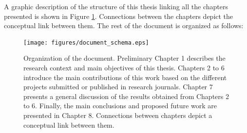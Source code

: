 A graphic description of the structure of this thesis linking all the chapters presented is shown in Figure \ref{document_structure}. Connections between the chapters depict the conceptual link between them. The rest of the document is organized as follows:

\begin{figure}[top]
  \begin{center}
    \texttt{[image: figures/document\_schema.eps]}
  \end{center}
    \caption[Organization of the document]{Organization of the document. Preliminary Chapter 1 describes the research context and main objectives of this thesis. Chapters 2 to 6 introduce the main contributions of this work based on the different projects submitted or published in research journals. Chapter 7 presents a general discussion of the results obtained from Chapters 2 to 6. Finally, the main conclusions and proposed future work are presented in Chapter 8. Connections between chapters depict a conceptual link between them.}
    \label{document_structure}
\end{figure}


